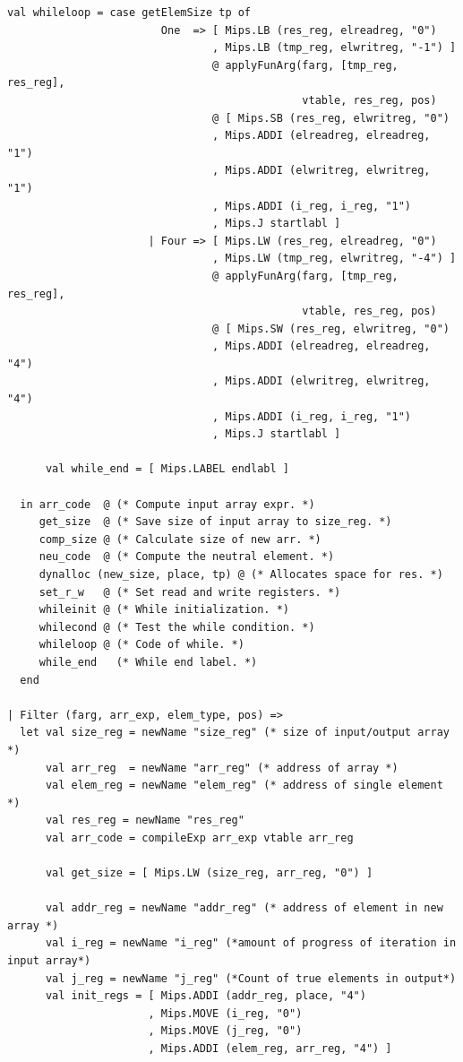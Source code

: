 \documentclass[11pt]{article}
\begin{document}
\begin{lstlisting}[basicstyle=\small]
      val whileloop = case getElemSize tp of
                        One  => [ Mips.LB (res_reg, elreadreg, "0")
                                , Mips.LB (tmp_reg, elwritreg, "-1") ]
                                @ applyFunArg(farg, [tmp_reg, res_reg],
                                              vtable, res_reg, pos)
                                @ [ Mips.SB (res_reg, elwritreg, "0")
                                , Mips.ADDI (elreadreg, elreadreg, "1")
                                , Mips.ADDI (elwritreg, elwritreg, "1")
                                , Mips.ADDI (i_reg, i_reg, "1")
                                , Mips.J startlabl ]
                      | Four => [ Mips.LW (res_reg, elreadreg, "0")
                                , Mips.LW (tmp_reg, elwritreg, "-4") ]
                                @ applyFunArg(farg, [tmp_reg, res_reg],
                                              vtable, res_reg, pos)
                                @ [ Mips.SW (res_reg, elwritreg, "0")
                                , Mips.ADDI (elreadreg, elreadreg, "4")
                                , Mips.ADDI (elwritreg, elwritreg, "4")
                                , Mips.ADDI (i_reg, i_reg, "1")
                                , Mips.J startlabl ]

      val while_end = [ Mips.LABEL endlabl ]

  in arr_code  @ (* Compute input array expr. *)
     get_size  @ (* Save size of input array to size_reg. *)
     comp_size @ (* Calculate size of new arr. *)
     neu_code  @ (* Compute the neutral element. *)
     dynalloc (new_size, place, tp) @ (* Allocates space for res. *)
     set_r_w   @ (* Set read and write registers. *)
     whileinit @ (* While initialization. *)
     whilecond @ (* Test the while condition. *)
     whileloop @ (* Code of while. *)
     while_end   (* While end label. *)
  end

| Filter (farg, arr_exp, elem_type, pos) =>
  let val size_reg = newName "size_reg" (* size of input/output array *)
      val arr_reg  = newName "arr_reg" (* address of array *)
      val elem_reg = newName "elem_reg" (* address of single element *)
      val res_reg = newName "res_reg"
      val arr_code = compileExp arr_exp vtable arr_reg

      val get_size = [ Mips.LW (size_reg, arr_reg, "0") ]

      val addr_reg = newName "addr_reg" (* address of element in new array *)
      val i_reg = newName "i_reg" (*amount of progress of iteration in input array*)
      val j_reg = newName "j_reg" (*Count of true elements in output*)
      val init_regs = [ Mips.ADDI (addr_reg, place, "4")
                      , Mips.MOVE (i_reg, "0")
                      , Mips.MOVE (j_reg, "0")
                      , Mips.ADDI (elem_reg, arr_reg, "4") ]


\end{lstlisting}
\end{document}
